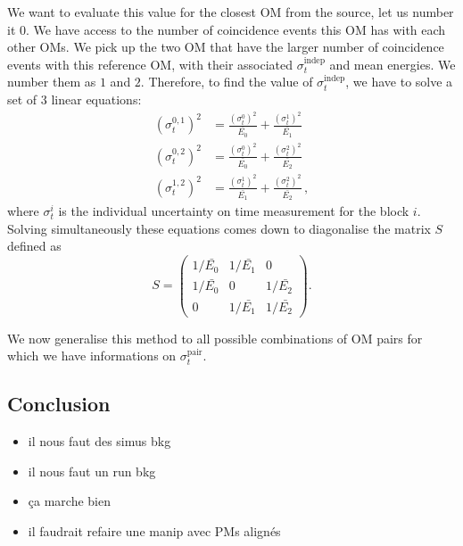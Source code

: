 We want to evaluate this value for the closest OM from the source, let us number it $0$.
We have access to the number of coincidence events this OM has with each other OMs.
We pick up the two OM that have the larger number of coincidence events with this reference OM, with their associated $\sigma_{t}^{\text{indep}}$ and mean energies.
We number them as $1$ and $2$.
Therefore, to find the value of $\sigma_{t}^{\text{indep}}$, we have to solve a set of $3$ linear equations:
\begin{align}
  (\sigma_{t}^{0,1})^{2} &= \frac{(\sigma_{t}^{0})^{2}}{\bar{E_{0}}} + \frac{(\sigma_{t}^{1})^{2}}{\bar{E_{1}}}\nonumber \\
  (\sigma_{t}^{0,2})^{2} &= \frac{(\sigma_{t}^{0})^{2}}{\bar{E_{0}}} + \frac{(\sigma_{t}^{2})^{2}}{\bar{E_{2}}}\\
  (\sigma_{t}^{1,2})^{2} &= \frac{(\sigma_{t}^{1})^{2}}{\bar{E_{1}}} + \frac{(\sigma_{t}^{2})^{2}}{\bar{E_{2}}} \nonumber\,,
  \label{eq:Co_sigma}
\end{align}
where $\sigma_{t}^{i}$ is the individual uncertainty on time measurement for the block $i$.
Solving simultaneously these equations comes down to diagonalise the matrix $S$ defined as
\begin{equation}
  S =
  \begin{pmatrix}
    1/\bar{E_{0}} & 1/\bar{E_{1}} & 0 \\
    1/\bar{E_{0}} & 0 & 1/\bar{E_{2}} \\
    0 & 1/\bar{E_{1}} & 1/\bar{E_{2}}
  \end{pmatrix}
  .
\end{equation}

We now generalise this method to all possible combinations of OM pairs for which we have informations on $\sigma_{t}^{\text{pair}}$.


\subsection{Conclusion}
\begin{itemize}
\item il nous faut des simus bkg
\item il nous faut un run bkg
\item ça marche bien
\item il faudrait refaire une manip avec PMs alignés
\end{itemize}


